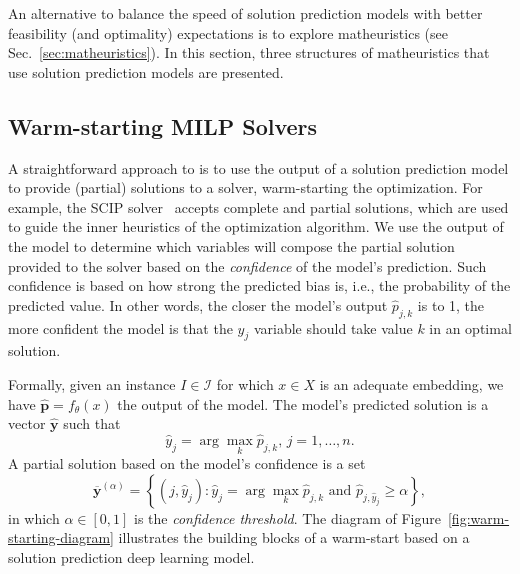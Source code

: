 An alternative to balance the speed of solution prediction models with better feasibility (and optimality) expectations is to explore matheuristics (see Sec.~\ref{sec:matheuristics}).
In this section, three structures of matheuristics that use solution prediction models are presented.

\subsection{Warm-starting MILP Solvers}

A straightforward approach to is to use the output of a solution prediction model to provide (partial) solutions to a solver, warm-starting the optimization.
For example, the SCIP solver~\cite{bestuzhevaSCIPOptimizationSuite2021} accepts complete and partial solutions, which are used to guide the inner heuristics of the optimization algorithm.
We use the output of the model to determine which variables will compose the partial solution provided to the solver based on the \emph{confidence} of the model's prediction.
Such confidence is based on how strong the predicted bias is, i.e., the probability of the predicted value.
In other words, the closer the model's output $\hat{p}_{j,k}$ is to 1, the more confident the model is that the $y_j$ variable should take value $k$ in an optimal solution.

Formally, given an instance $I\in \mathcal{I}$ for which $x\in X$ is an adequate embedding, we have $\hat{\bm{p}} = f_\theta(x)$ the output of the model.
The model's predicted solution is a vector $\hat{\bm{y}}$ such that \[
    \hat{y}_j = \arg\max_{k} \hat{p}_{j,k},\, j=1,\ldots,n
.\] 
A partial solution based on the model's confidence is a set
\begin{equation}\label{eq:partial-solution}
    \overline{\bm{y}}^{(\alpha)} = \left\{ (j,\hat{y}_j) : \hat{y}_j = \arg\max_{k} \hat{p}_{j,k}\text{ and } \hat{p}_{j,\hat{y}_j} \ge  \alpha \right\}
,\end{equation}
in which $\alpha \in [0,1]$ is the \emph{confidence threshold}.
The diagram of Figure~\ref{fig:warm-starting-diagram} illustrates the building blocks of a warm-start based on a solution prediction deep learning model.


